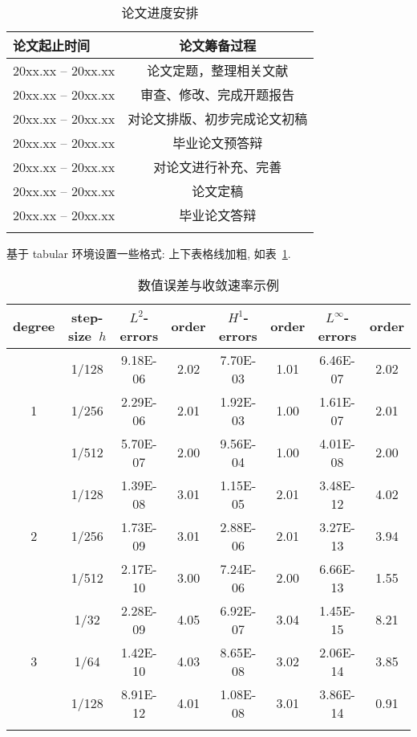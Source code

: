 \begin{table}[htp!]
\centering
\caption{论文进度安排}
\begin{tabularx}{0.8\textwidth}{|P{4cm}|C|}
\Xhline{2\arrayrulewidth}
论文起止时间       &  论文筹备过程 \\
\hline
20xx.xx -- 20xx.xx    &  论文定题，整理相关文献 \\
\hline
20xx.xx -- 20xx.xx    &  审查、修改、完成开题报告 \\
\hline
20xx.xx -- 20xx.xx   &  对论文排版、初步完成论文初稿 \\
\hline
20xx.xx -- 20xx.xx    &  毕业论文预答辩 \\
\hline
20xx.xx -- 20xx.xx    &  对论文进行补充、完善 \\
\hline
20xx.xx -- 20xx.xx    &  论文定稿 \\
\hline
20xx.xx -- 20xx.xx    &  毕业论文答辩 \\
\Xhline{2\arrayrulewidth}
\end{tabularx}
\end{table}


\clearpage
基于 tabular 环境设置一些格式: 上下表格线加粗, 如表~\ref{tab:error1}.
\begin{table}[!htp]
\centering
\caption{数值误差与收敛速率示例}
\label{tab:error1}
\begin{tabular}{c|c|cc|cc|cc}
\Xhline{2\arrayrulewidth}
degree &  step-size~$h$  & $L^2$-errors  &  order  & $H^1$-errors & order & $L^\infty$-errors  &  order \\
\hline
  & 1/128 & 9.18E-06 & 2.02 & 7.70E-03 & 1.01  & 6.46E-07 & 2.02 \\
1 & 1/256 & 2.29E-06 & 2.01 & 1.92E-03 & 1.00  & 1.61E-07 & 2.01 \\
  & 1/512 & 5.70E-07 & 2.00 & 9.56E-04 & 1.00  & 4.01E-08 & 2.00 \\
\hline
  & 1/128 & 1.39E-08 & 3.01 & 1.15E-05 & 2.01  & 3.48E-12 & 4.02 \\
2 & 1/256 & 1.73E-09 & 3.01 & 2.88E-06 & 2.01  & 3.27E-13 & 3.94 \\
  & 1/512 & 2.17E-10 & 3.00 & 7.24E-06 & 2.00  & 6.66E-13 & 1.55 \\
\hline
  & 1/32  & 2.28E-09 & 4.05 & 6.92E-07 & 3.04  & 1.45E-15 & 8.21 \\
3 & 1/64  & 1.42E-10 & 4.03 & 8.65E-08 & 3.02  & 2.06E-14 & 3.85 \\
  & 1/128 & 8.91E-12 & 4.01 & 1.08E-08 & 3.01  & 3.86E-14 & 0.91 \\
\Xhline{2\arrayrulewidth}
\end{tabular}
\end{table}

